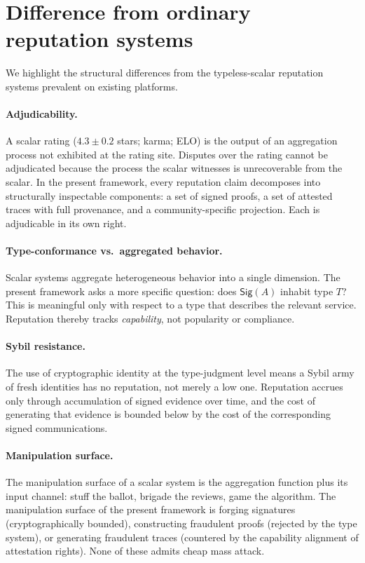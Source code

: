 \documentclass[11pt]{article}
\theoremstyle{definition}
\theoremstyle{plain}
\theoremstyle{remark}
\newcommand{\Sig}{\mathsf{Sig}}
\begin{document}
\section{Difference from ordinary reputation systems}\label{sec:diff}

We highlight the structural differences from the typeless-scalar reputation systems prevalent on existing platforms.

\paragraph{Adjudicability.} A scalar rating ($4.3 \pm 0.2$ stars; karma; ELO) is the output of an aggregation process not exhibited at the rating site. Disputes over the rating cannot be adjudicated because the process the scalar witnesses is unrecoverable from the scalar. In the present framework, every reputation claim decomposes into structurally inspectable components: a set of signed proofs, a set of attested traces with full provenance, and a community-specific projection. Each is adjudicable in its own right.

\paragraph{Type-conformance vs.\ aggregated behavior.} Scalar systems aggregate heterogeneous behavior into a single dimension. The present framework asks a more specific question: does $\Sig(A)$ inhabit type $T$? This is meaningful only with respect to a type that describes the relevant service. Reputation thereby tracks \emph{capability}, not popularity or compliance.

\paragraph{Sybil resistance.} The use of cryptographic identity at the type-judgment level means a Sybil army of fresh identities has no reputation, not merely a low one. Reputation accrues only through accumulation of signed evidence over time, and the cost of generating that evidence is bounded below by the cost of the corresponding signed communications.

\paragraph{Manipulation surface.} The manipulation surface of a scalar system is the aggregation function plus its input channel: stuff the ballot, brigade the reviews, game the algorithm. The manipulation surface of the present framework is forging signatures (cryptographically bounded), constructing fraudulent proofs (rejected by the type system), or generating fraudulent traces (countered by the capability alignment of attestation rights). None of these admits cheap mass attack.
\end{document}
